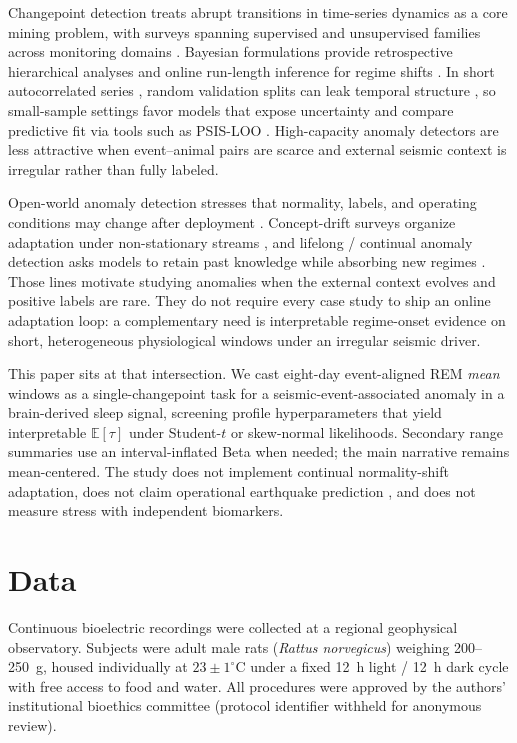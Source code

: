 Changepoint detection treats abrupt transitions in time-series dynamics as a core mining problem, with surveys spanning supervised and unsupervised families across monitoring domains \cite{Aminikhanghahi2017}. Bayesian formulations provide retrospective hierarchical analyses \cite{carlin1992hierarchical} and online run-length inference for regime shifts \cite{Adams2007}. In short autocorrelated series \cite{Hyndman2018}, random validation splits can leak temporal structure \cite{Bergmeir2012}, so small-sample settings favor models that expose uncertainty \cite{Sinkovec2022} and compare predictive fit via tools such as PSIS-LOO \cite{Vehtari2017}. High-capacity anomaly detectors are less attractive when event--animal pairs are scarce and external seismic context is irregular rather than fully labeled.

Open-world anomaly detection stresses that normality, labels, and operating conditions may change after deployment \cite{Chandola2009,Han2023}. Concept-drift surveys organize adaptation under non-stationary streams \cite{Gama2014}, and lifelong / continual anomaly detection asks models to retain past knowledge while absorbing new regimes \cite{Faber2024}. Those lines motivate studying anomalies when the external context evolves and positive labels are rare. They do not require every case study to ship an online adaptation loop: a complementary need is interpretable regime-onset evidence on short, heterogeneous physiological windows under an irregular seismic driver.

This paper sits at that intersection. We cast eight-day event-aligned REM \emph{mean} windows as a single-changepoint task for a seismic-event-associated anomaly in a brain-derived sleep signal, screening profile hyperparameters that yield interpretable \(\mathbb{E}[\tau]\) under Student-\(t\) or skew-normal likelihoods. Secondary range summaries use an interval-inflated Beta when needed; the main narrative remains mean-centered. The study does not implement continual normality-shift adaptation, does not claim operational earthquake prediction \cite{Geller1997}, and does not measure stress with independent biomarkers.

\section{Data}

\ifOWADAnonymous
Continuous bioelectric recordings were collected at a regional geophysical observatory. Subjects were adult male rats (\textit{Rattus norvegicus}) weighing 200–250~g, housed individually at \(23\pm 1^{\circ}\)C under a fixed 12~h light / 12~h dark cycle with free access to food and water. All procedures were approved by the authors' institutional bioethics committee (protocol identifier withheld for anonymous review).

